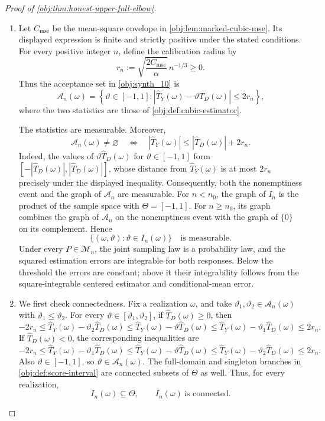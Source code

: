 \begin{proof}[Proof of \cref{obj:thm:honest-upper-full-elbow}]
\begin{enumerate}
\item
Let \(C_{\mathrm{mse}}\) be the mean-square envelope in
\cref{obj:lem:marked-cubic-mse}. Its displayed expression is finite and strictly positive under the stated conditions. For every positive integer \(n\), define the calibration radius by
\[
r_n:=\sqrt{\frac{2C_{\mathrm{mse}}}{\alpha}}\,n^{-1/3}\ge0.
\]
Thus the acceptance set in \cref{obj:synth_10} is
\[
\mathcal A_n(\omega)
=
\left\{\vartheta\in[-1,1]:
\left|\widehat T_Y(\omega)-\vartheta\widehat T_D(\omega)\right|
\le2r_n\right\},
\]
where the two statistics are those of \cref{obj:def:cubic-estimator}.

The statistics are measurable. Moreover,
\[
\mathcal A_n(\omega)\ne\varnothing
\quad\Longleftrightarrow\quad
|\widehat T_Y(\omega)|
\le|\widehat T_D(\omega)|+2r_n.
\]
Indeed, the values of \(\vartheta\widehat T_D(\omega)\) for
\(\vartheta\in[-1,1]\) form
\([ -|\widehat T_D(\omega)|,|\widehat T_D(\omega)|]\), whose distance from
\(\widehat T_Y(\omega)\) is at most \(2r_n\) precisely under the displayed inequality. Consequently, both the nonemptiness event and the graph of \(\mathcal A_n\) are measurable. For \(n<n_0\), the graph of \(I_n\) is the product of the sample space with \(\Theta=[-1,1]\). For \(n\ge n_0\), its graph combines the graph of \(\mathcal A_n\) on the nonemptiness event with the graph of \(\{0\}\) on its complement. Hence
\[
\{(\omega,\vartheta):\vartheta\in I_n(\omega)\}
\quad\text{is measurable}.
\]
Under every \(P\in\mathcal M_n\), the joint sampling law is a probability law, and the squared estimation errors are integrable for both responses. Below the threshold the errors are constant; above it their integrability follows from the square-integrable centered estimator and conditional-mean error.

\item
We first check connectedness. Fix a realization \(\omega\), and take
\(\vartheta_1,\vartheta_2\in\mathcal A_n(\omega)\) with
\(\vartheta_1\le\vartheta_2\). For every
\(\vartheta\in[\vartheta_1,\vartheta_2]\), if
\(\widehat T_D(\omega)\ge0\), then
\[
-2r_n
\le \widehat T_Y(\omega)-\vartheta_2\widehat T_D(\omega)
\le \widehat T_Y(\omega)-\vartheta\widehat T_D(\omega)
\le \widehat T_Y(\omega)-\vartheta_1\widehat T_D(\omega)
\le2r_n.
\]
If \(\widehat T_D(\omega)<0\), the corresponding inequalities are
\[
-2r_n
\le \widehat T_Y(\omega)-\vartheta_1\widehat T_D(\omega)
\le \widehat T_Y(\omega)-\vartheta\widehat T_D(\omega)
\le \widehat T_Y(\omega)-\vartheta_2\widehat T_D(\omega)
\le2r_n.
\]
Also \(\vartheta\in[-1,1]\), so \(\vartheta\in\mathcal A_n(\omega)\).
The full-domain and singleton branches in \cref{obj:def:score-interval}
are connected subsets of \(\Theta\) as well. Thus, for every realization,
\[
I_n(\omega)\subseteq\Theta,
\qquad I_n(\omega)\ \text{is connected}.
\]


\end{enumerate}
\end{proof}
